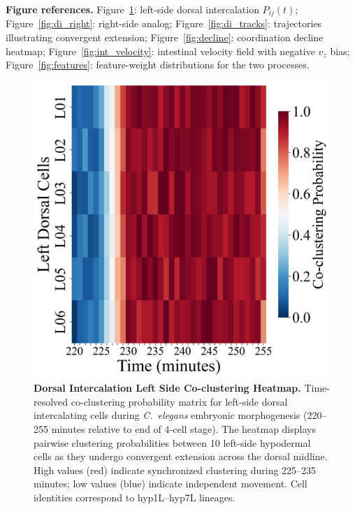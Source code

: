 \documentclass[unnumsec,webpdf,modern,large,namedate]{oup-authoring-template}%
\theoremstyle{thmstyleone}\newtheorem{theorem}{Theorem}
\theoremstyle{thmstyletwo}\newtheorem{example}{Example}
\theoremstyle{thmstylethree}\newtheorem{definition}{Definition}
\begin{document}
\vspace{0.5em}
\noindent\textbf{Figure references.} Figure~\ref{fig:di_left}: left-side dorsal intercalation $P_{ij}(t)$; Figure~\ref{fig:di_right}: right-side analog; Figure~\ref{fig:di_tracks}: trajectories illustrating convergent extension; Figure~\ref{fig:decline}: coordination decline heatmap; Figure~\ref{fig:int_velocity}: intestinal velocity field with negative $v_z$ bias; Figure~\ref{fig:features}: feature-weight distributions for the two processes.

\begin{figure}[t]
  \centering
  \includegraphics[width=\linewidth]{Demo1A_Dorsal_Left_Coclustering_Heatmap.png}
  \caption{\textbf{Dorsal Intercalation Left Side Co-clustering Heatmap.} Time-resolved co-clustering probability matrix for left-side dorsal intercalating cells during \textit{C.~elegans} embryonic morphogenesis (220--255 minutes relative to end of 4-cell stage). The heatmap displays pairwise clustering probabilities between 10 left-side hypodermal cells as they undergo convergent extension across the dorsal midline. High values (red) indicate synchronized clustering during 225--235 minutes; low values (blue) indicate independent movement. Cell identities correspond to hyp1L--hyp7L lineages.}
  \label{fig:di_left}
\end{figure}
\end{document}
